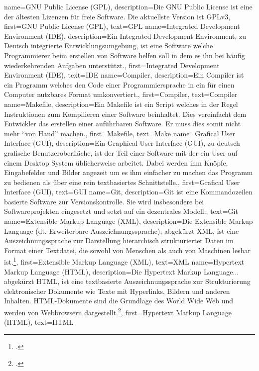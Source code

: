 {
    name={GNU Public License (GPL)},
    description={Die GNU Public License ist eine der ältesten Lizenzen für
      freie Software. Die aktuellste Version ist GPLv3},
    first={GNU Public License (GPL)},
    text={GPL}
}
{
    name={Integrated Development Environment (IDE)},
    description={Ein Integrated Development Environment, zu Deutsch integrierte
        Entwicklungsumgebung, ist eine Software welche Programmierer beim
        erstellen von Software helfen soll in dem es ihn bei häufig
        wiederkehrenden Aufgaben unterstützt.},
    first={Integrated Development Environment (IDE)},
    text={IDE}
}
{
    name={Compiler},
    description={Ein Compiler ist ein Programm welches den Code einer
      Programmiersprache in ein für einen Computer nutzbares Format
      umkonvertiert.},
    first={Compiler},
    text={Compiler}
}
{
    name={Makefile},
    description={Ein Makefile ist ein Script welches in der Regel Instruktionen
    zum Kompilieren einer Software beinhaltet. Dies vereinfacht dem Entwickler
    das erstellen einer auführbaren Software. Er muss dies somit nicht mehr
    ``von Hand'' machen.},
    first={Makefile},
    text={Make}
}
{
    name={Grafical User Interface (GUI)},
    description={Ein Graphical User Interface (GUI), zu deutsch grafische
      Benutzeroberfläche, ist der Teil einer Software mit der ein User auf
      einem Desktop System üblicherweise arbeitet. Dabei werden ihm Knöpfe,
      Eingabefelder und Bilder angezeit um es ihm einfacher zu machen das
      Programm zu bedienen als über eine rein textbasiertes Schnittstelle.},
    first={Grafical User Interface (GUI)},
    text={GUI}
}
{
    name={Git},
    description={Git ist eine Kommandozeilen basierte Software zur
      Versionskontrolle. Sie wird insbesondere bei Softwareprojekten eingesetzt
    und setzt auf ein dezentrales Modell.},
    text={Git}
}
{
    name={Extensible Markup Language (XML)},
    description={Die Extensible Markup Language (dt. Erweiterbare
      Auszeichnungssprache), abgekürzt XML, ist eine Auszeichnungssprache zur
      Darstellung hierarchisch strukturierter Daten im Format einer Textdatei, die
      sowohl von Menschen als auch von Maschinen lesbar ist.\footcite{xml}},
    first={Extensible Markup Language (XML)},
    text={XML}
}
{
    name={Hypertext Markup Language (HTML)},
    description={Die Hypertext Markup Language... abgekürzt HTML, ist eine textbasierte
      Auszeichnungssprache zur Strukturierung elektronischer Dokumente wie Texte mit
      Hyperlinks, Bildern und anderen Inhalten. HTML-Dokumente sind die Grundlage des
      World Wide Web und werden von Webbrowsern dargestellt.\footcite{html}},
    first={Hypertext Markup Language (HTML)},
    text={HTML}
}
